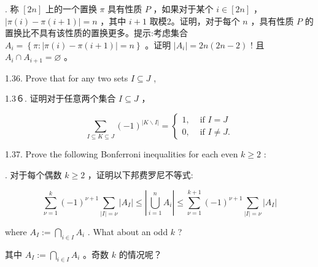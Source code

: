 \documentclass[10pt]{article}
\begin{document}
\begin{tcolorbox}. 称 \(\left\lbrack  {2n}\right\rbrack\) 上的一个置换 \(\pi\) 具有性质 \(P\) ，如果对于某个 \(i \in  \left\lbrack  {2n}\right\rbrack\) ， \(\left| {\pi \left( i\right)  - \pi \left( {i + 1}\right) }\right|  = n\) ，其中 \(i + 1\) 取模2。证明，对于每个 \(n\) ，具有性质 \(P\) 的置换比不具有该性质的置换更多。提示:考虑集合 \({A}_{i} = \left\{  {\pi  : \left| {\pi \left( i\right)  - \pi \left( {i + 1}\right) }\right|  = n}\right\}\) 。证明 \(\left| {A}_{i}\right|  = {2n}\left( {{2n} - 2}\right)\) ! 且 \({A}_{i} \cap  {A}_{i + 1} = \varnothing\) 。
\end{tcolorbox}

1.36. Prove that for any two sets \(I \subseteq  J\) ,

\begin{tcolorbox}\relax
1.3６. 证明对于任意两个集合 \(I \subseteq  J\) ，
\end{tcolorbox}

\[
\mathop{\sum }\limits_{{I \subseteq  K \subseteq  J}}{\left( -1\right) }^{\left| K \smallsetminus  I\right| } = \left\{  \begin{array}{ll} 1, & \text{ if }I = J \\  0, & \text{ if }I \neq  J. \end{array}\right.
\]

1.37. Prove the following Bonferroni inequalities for each even \(k \geq  2\) :

\begin{tcolorbox}. 对于每个偶数 \(k \geq  2\) ，证明以下邦费罗尼不等式:
\end{tcolorbox}

\[
\mathop{\sum }\limits_{{\nu  = 1}}^{k}{\left( -1\right) }^{\nu  + 1}\mathop{\sum }\limits_{{\left| I\right|  = \nu }}\left| {A}_{I}\right|  \leq  \left| {\mathop{\bigcup }\limits_{{i = 1}}^{n}{A}_{i}}\right|  \leq  \mathop{\sum }\limits_{{\nu  = 1}}^{{k + 1}}{\left( -1\right) }^{\nu  + 1}\mathop{\sum }\limits_{{\left| I\right|  = \nu }}\left| {A}_{I}\right|
\]

where \({A}_{I} \mathrel{\text{ := }} \mathop{\bigcap }\limits_{{i \in  I}}{A}_{i}\) . What about an odd \(k\) ?

\begin{tcolorbox}\relax
其中 \({A}_{I} \mathrel{\text{ := }} \mathop{\bigcap }\limits_{{i \in  I}}{A}_{i}\) 。奇数 \(k\) 的情况呢？
\end{tcolorbox}
\end{document}
